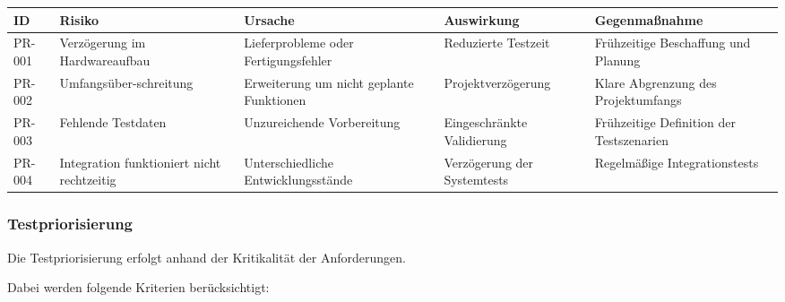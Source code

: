 \documentclass[
  a4paper,
  12pt,
  DIV=12,        %
  parskip=half,  %
  headings=small %
]{scrartcl}
\theoremstyle{definition}
\theoremstyle{definition}
\begin{document}
\begin{longtable}[]{@{}
  >{\raggedright\arraybackslash}p{}
  >{\raggedright\arraybackslash}p{}
  >{\raggedright\arraybackslash}p{}
  >{\raggedright\arraybackslash}p{}
  >{\raggedright\arraybackslash}p{}@{}}
\toprule\noalign{}
\begin{minipage}[b]{\linewidth}\raggedright
ID
\end{minipage} & \begin{minipage}[b]{\linewidth}\raggedright
Risiko
\end{minipage} & \begin{minipage}[b]{\linewidth}\raggedright
Ursache
\end{minipage} & \begin{minipage}[b]{\linewidth}\raggedright
Auswirkung
\end{minipage} & \begin{minipage}[b]{\linewidth}\raggedright
Gegenmaßnahme
\end{minipage} \\
\midrule\noalign{}
\endhead
\bottomrule\noalign{}
\endlastfoot
PR-001 & Verzögerung im Hardwareaufbau & Lieferprobleme oder
Fertigungsfehler & Reduzierte Testzeit & Frühzeitige Beschaffung und
Planung \\
PR-002 & Umfangsüber-schreitung & Erweiterung um nicht geplante
Funktionen & Projektverzögerung & Klare Abgrenzung des Projektumfangs \\
PR-003 & Fehlende Testdaten & Unzureichende Vorbereitung &
Eingeschränkte Validierung & Frühzeitige Definition der Testszenarien \\
PR-004 & Integration funktioniert nicht rechtzeitig & Unterschiedliche
Entwicklungsstände & Verzögerung der Systemtests & Regelmäßige
Integrationstests \\
\end{longtable}

\subsubsection{Testpriorisierung}\label{testpriorisierung-1}

Die Testpriorisierung erfolgt anhand der Kritikalität der Anforderungen.

Dabei werden folgende Kriterien berücksichtigt:
\end{document}
